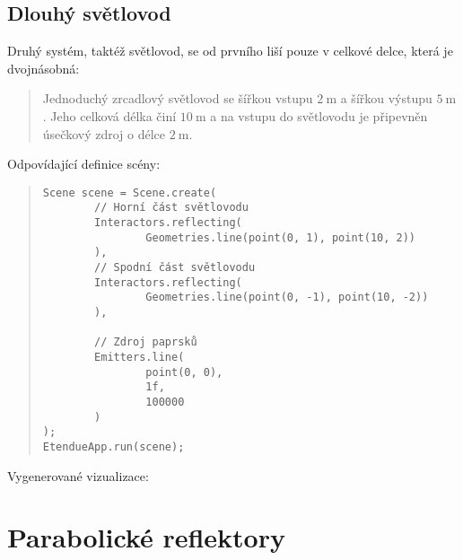 

\subsection{Dlouhý světlovod}

Druhý systém, taktéž světlovod, se od prvního liší pouze v celkové delce, která je dvojnásobná:

\begin{quote}
    Jednoduchý zrcadlový světlovod se šířkou vstupu $2\ \mathrm{m}$ a šířkou výstupu $5\ \mathrm{m}$. Jeho celková délka činí $10\ \mathrm{m}$ a na vstupu do světlovodu je připevněn úsečkový zdroj o délce $2\ \mathrm{m}$.
\end{quote}

Odpovídající definice scény:

\begin{minipage}{\textwidth}\begin{quote}\begin{lstlisting}
Scene scene = Scene.create(
        // Horní část světlovodu
        Interactors.reflecting(
                Geometries.line(point(0, 1), point(10, 2))
        ),
        // Spodní část světlovodu
        Interactors.reflecting(
                Geometries.line(point(0, -1), point(10, -2))
        ),

        // Zdroj paprsků
        Emitters.line(
                point(0, 0),
                1f,
                100000
        )
);
EtendueApp.run(scene);
\end{lstlisting}\end{quote}\end{minipage}

Vygenerované vizualizace:




\section{Parabolické reflektory}

